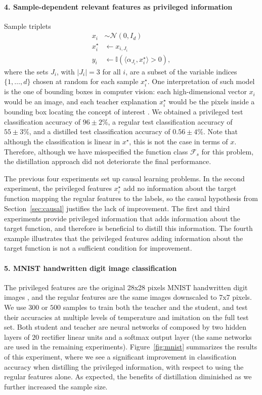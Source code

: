 \documentclass{article}
\begin{document}
\paragraph{4. Sample-dependent relevant features as privileged information}
Sample triplets
\begin{align*}
  x_i       &\sim \mathcal{N}(0,I_d)\\
  x^\star_i &\leftarrow x_{i,{J_i}}\\
  y_i       &\leftarrow \mathbb{I}(\langle \alpha_{J_i}, x^\star_i\rangle > 0),
\end{align*}
where the sets $J_i$, with $|J_i| = 3$ for all $i$, are a subset of the
variable indices $\{1, \ldots, d\}$ chosen at random for each sample
$x^\star_i$. One interpretation of such model is the one of bounding boxes in
computer vision: each high-dimensional vector $x_i$ would be an image, and each
teacher explanation $x^\star_i$ would be the pixels inside a bounding box
locating the concept of interest \citep{Sharmanska13}.
We obtained a privileged test classification accuracy of $96 \pm 2\%$, a
regular test classification accuracy of $55\pm 3\%$, and a distilled
test classification accuracy of $0.56\pm 4\%$. Note that
although the classification is linear in $x^\star$, this is not the case in
terms of $x$. Therefore, although we have misspecified the function class
$\mathcal{F}_s$ for this problem, the distillation approach did not deteriorate
the final performance.

The previous four experiments set up causal learning problems. In the second
experiment, the privileged features $x^\star_i$ add no information about the
target function mapping the regular features to the labels, so the causal
hypothesis from Section~\ref{sec:causal} justifies the lack of improvement. The
first and third experiments provide privileged information that adds
information about the target function, and therefore is beneficial to distill
this information. The fourth example illustrates that 
the privileged features adding information about
the target function is not a sufficient condition for improvement.

\paragraph{5. MNIST handwritten digit image classification} The privileged
features are the original 28x28 pixels MNIST handwritten digit images
\citep{MNIST}, and the regular features are the same images downscaled to 7x7
pixels. We use $300$ or $500$ samples to train both the teacher and the
student, and test their accuracies at multiple levels of temperature and
imitation on the full test set. Both student and teacher are neural networks of
composed by two hidden layers of $20$ rectifier linear units and a softmax
output layer (the same networks are used in the remaining experiments).
Figure~\ref{fig:mnist} summarizes the results of this experiment, where we see
a significant improvement in classification accuracy when distilling the
privileged information, with respect to using the regular features alone. As
expected, the benefits of distillation diminished as we further increased the
sample size.
\end{document}
